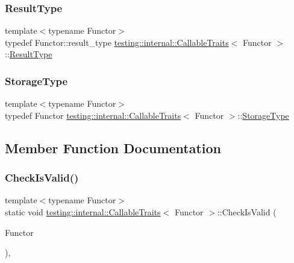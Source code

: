 \subsubsection{\texorpdfstring{Result\+Type}{ResultType}}
{\footnotesize\ttfamily template$<$typename Functor$>$ \\
typedef Functor\+::result\+\_\+type \hyperlink{structtesting_1_1internal_1_1_callable_traits}{testing\+::internal\+::\+Callable\+Traits}$<$ Functor $>$\+::\hyperlink{structtesting_1_1internal_1_1_callable_traits_a242d198dd1c56a153ba931d7166ec7f3}{Result\+Type}}

\mbox{\label{structtesting_1_1internal_1_1_callable_traits_a23cc0c86a3bd18b2f8dd159dd44e1168}} 
\subsubsection{\texorpdfstring{Storage\+Type}{StorageType}}
{\footnotesize\ttfamily template$<$typename Functor$>$ \\
typedef Functor \hyperlink{structtesting_1_1internal_1_1_callable_traits}{testing\+::internal\+::\+Callable\+Traits}$<$ Functor $>$\+::\hyperlink{structtesting_1_1internal_1_1_callable_traits_a23cc0c86a3bd18b2f8dd159dd44e1168}{Storage\+Type}}



\subsection{Member Function Documentation}
\mbox{\label{structtesting_1_1internal_1_1_callable_traits_ab09a6487235947ec9c5d933d07ac605b}} 
\subsubsection{\texorpdfstring{Check\+Is\+Valid()}{CheckIsValid()}}
{\footnotesize\ttfamily template$<$typename Functor$>$ \\
static void \hyperlink{structtesting_1_1internal_1_1_callable_traits}{testing\+::internal\+::\+Callable\+Traits}$<$ Functor $>$\+::Check\+Is\+Valid (\begin{DoxyParamCaption}\item[{Functor}]{ }\end{DoxyParamCaption})\hspace{0.3cm}{\ttfamily [inline]}, {\ttfamily [static]}}

